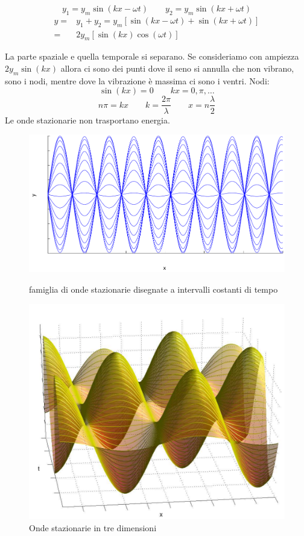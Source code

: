 \parbox[]{\textwidth}{
\begin{equation*}
y_1=y_m\sin\left(kx-\omega t\right)\qquad y_2=y_m\sin\left(kx+\omega t\right)
\end{equation*}
\begin{align*}
y=&y_1+y_2=y_m\left[\sin\left(kx-\omega t\right)+\sin\left(kx+\omega t\right)\right]\\
=&2y_m\left[\sin\left(kx\right)\cos\left(\omega t\right)\right]
\end{align*}
}
La parte spaziale e quella temporale si separano. Se consideriamo con ampiezza $2y_m\sin\left(kx\right)$ allora ci sono dei punti dove il seno si annulla che non vibrano, sono i nodi, mentre dove la vibrazione è massima ci sono i ventri. Nodi:
$$\sin\left(kx\right)=0\qquad kx=0,\pi,\ldots$$
$$n\pi=kx\qquad k=\frac{2\pi}{\lambda}\qquad x=n\frac{\lambda}{2}$$
Le onde stazionarie non trasportano energia.
\begin{figure}[htbp]
   \centering
   \includegraphics[scale=0.5]{immagini/fisica1/stazionarie1}
   \caption{famiglia di onde stazionarie disegnate a intervalli costanti di tempo}
   \includegraphics[scale=0.7]{immagini/fisica1/stazionarie2}
   \caption{Onde stazionarie in tre dimensioni}
\end{figure}

